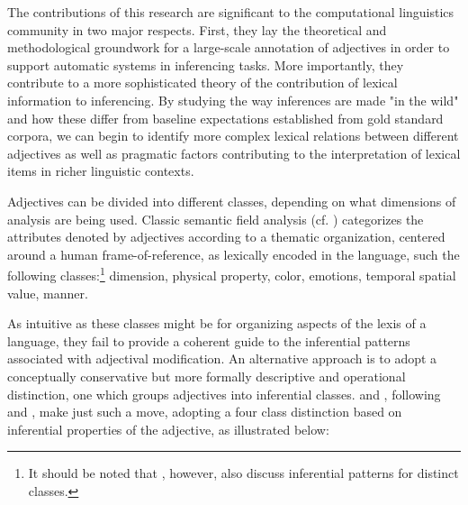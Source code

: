 \documentclass[10pt]{article}
\begin{document}
The contributions of this research are significant to the computational linguistics community in two major respects.  
First, they lay the theoretical and  methodological groundwork for a large-scale annotation of adjectives in order to support automatic systems in inferencing tasks. 
More importantly, they contribute to a more sophisticated theory of the contribution of lexical information to inferencing. 
By studying the way inferences are made "in the wild" and how these differ from baseline expectations established from gold standard corpora, we can begin to identify more complex lexical relations between different adjectives as well as pragmatic factors contributing to the interpretation of lexical items in richer linguistic contexts.

 
% 

Adjectives can be divided into different classes, depending on what dimensions of analysis are being used. Classic 
semantic field analysis (cf. \cite{dixon:91,lyons:77,raskin1995lexical})   categorizes the attributes denoted by adjectives according to a thematic organization, centered around a human frame-of-reference, as lexically encoded in  the language, such the following classes:\footnote{It should be noted that \cite{raskin1995lexical} , however, also discuss inferential patterns for distinct classes.}
{\sc dimension}, 
{\sc physical property}, {\sc color}, {\sc emotions}, {\sc temporal}
{\sc spatial}
{\sc value},
{\sc manner}. 

\noindent As intuitive as these classes might be for organizing aspects of the lexis of a language, they fail to provide a coherent guide to the inferential patterns associated with adjectival modification. 
An alternative approach is to 
 adopt a conceptually conservative but more formally descriptive and operational distinction, one which groups adjectives into inferential classes. \cite{amoia2006adjective} and \cite{amoia2008test}, following \cite{Kamp75twotheories} and \cite{Kamp95prototypetheory}, make just such a move, adopting a four class distinction based on inferential properties of the adjective, as illustrated below:
 
\end{document}
